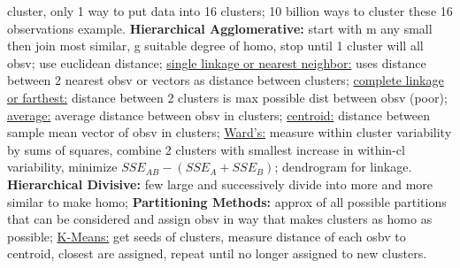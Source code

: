 \documentclass[9pt]{extarticle}
\begin{document}
cluster, only 1 way to put data into 16 clusters; 10 billion ways to cluster 
these 16 observations example.
\textbf{Hierarchical Agglomerative:} start with m any small then join most 
similar, g suitable degree of homo, stop until 1 cluster will all obsv; 
use euclidean distance; \underline{single linkage or nearest neighbor:} uses 
distance between 2 nearest obsv or vectors as distance between clusters; 
\underline{complete linkage or farthest:} distance between 2 clusters is max 
possible dist between obsv (poor); \underline{average:} average distance between 
obsv in clusters; \underline{centroid:} distance between sample mean vector of 
obsv in clusters; \underline{Ward's:} measure within cluster variability by 
sums of squares, combine 2 clusters with smallest increase in within-cl
variability, minimize $SSE_{AB} - (SSE_A + SSE_B)$; dendrogram for linkage.
\textbf{Hierarchical Divisive:} few large and successively divide into more
and more similar to make homo; 
\textbf{Partitioning Methods:} approx of all possible partitions that can be 
considered and assign obsv in way that makes clusters as homo as possible; 
\underline{K-Means:} get seeds of clusters, measure distance of each osbv to 
centroid, closest are assigned, repeat until no longer assigned to new 
clusters.\\
\end{document}
